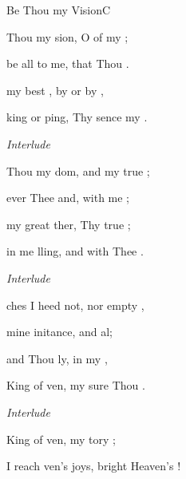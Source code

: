 \documentclass[12pt]{book}
\begin{document}
\mainmatter
\ifWordBk
  \twocolumn
\fi

\begin{song}{Be Thou my Vision}{C}{}{}{}{}


  \begin{SBVerse}
     Thou my sion, O  of my ;

     be all  to me,  that Thou .

     my best , by  or by ,

    king or ping, Thy sence my .

    \emph{Interlude} \Ch{[}{}    \Ch{]}{}
  \end{SBVerse}

  \begin{SBVerse}
     Thou my dom, and  my true ;

     ever  Thee and,  with me ;

     my great ther,  Thy true ;

     in me lling, and  with Thee .

    \emph{Interlude} \Ch{[}{}    \Ch{]}{}
  \end{SBVerse}


  \begin{SBVerse}
    ches I heed  not, nor  empty ,

     mine initance,  and al;

     and Thou ly,  in my ,

     King of ven, my sure Thou .

    \emph{Interlude} \Ch{[}{}   \Ch{D]}{change}
  \end{SBVerse}


  \begin{SBVerse}
     King of ven, my tory ;

     I reach ven's joys,  bright Heaven's !


\end{SBVerse}
\end{song}
\end{document}

